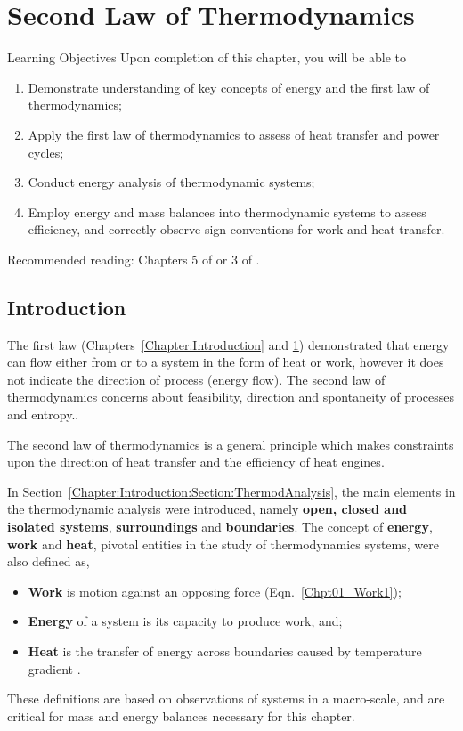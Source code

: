 
\chapter{Second Law of Thermodynamics}\label{Chapter:FirstLaw}

   \begin{LearningObjectivesBlock}{Learning Objectives}
      Upon completion of this chapter, you will be able to
        \begin{enumerate}
           \item Demonstrate understanding of key concepts of energy and the first law of thermodynamics;
           \item Apply the first law of thermodynamics to assess of heat transfer and power cycles;
           \item Conduct energy analysis of thermodynamic systems;
           \item Employ energy and mass balances into thermodynamic systems to assess efficiency, and correctly observe sign conventions for work and heat transfer.
        \end{enumerate}
\medskip
     Recommended reading: Chapters 5 of \citet{SmithVanNess_Book,Moran_Book,Borgnakke_Book} or 3 of \citet{Atkins_Book}.
   \end{LearningObjectivesBlock}


  
   \section{Introduction}\label{Chapter:SecondLaw:Section:Intro}
   The first law (Chapters~\ref{Chapter:Introduction} and \ref{Chapter:FirstLaw}) demonstrated that energy can flow either from or to a system in the form of heat or work, however it does not indicate the direction of process (\ie energy flow). The second law of thermodynamics concerns about feasibility, direction and spontaneity of processes and entropy..
   
The second law of thermodynamics is a general principle which makes constraints upon the direction of heat transfer and the efficiency of heat engines.



   
     In Section~\ref{Chapter:Introduction:Section:ThermodAnalysis}, the main elements in the thermodynamic analysis were introduced, namely {\bf open, closed and isolated systems}, {\bf surroundings} and {\bf boundaries}. The concept of {\bf energy}, {\bf work} and {\bf heat}, pivotal entities in the study of thermodynamics systems, were also defined as,
     \begin{itemize}
        \item {\bf Work} is motion against an opposing force (Eqn.~\ref{Chpt01_Work1});
        \item {\bf Energy} of a system is its capacity to produce work, and; 
        \item {\bf Heat} is the transfer of energy across boundaries caused by temperature gradient \citep{Devoe_Book}.
     \end{itemize}
     These definitions are based on observations of systems in a macro-scale, and are critical for mass and energy balances necessary for this chapter. 

